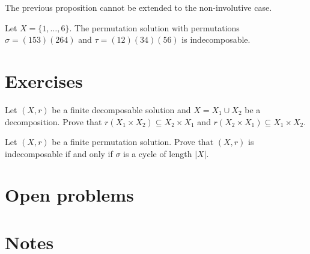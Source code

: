 The previous proposition cannot be extended to the non-involutive case. 

\begin{example}
Let $X=\{1,\dots,6\}$. The permutation solution with 
permutations $\sigma=(153)(264)$ and $\tau=(12)(34)(56)$ is indecomposable.
\end{example}

\section*{Exercises}

\begin{prob}
\label{prob:decomposition}
Let $(X,r)$ be a finite decomposable solution and $X=X_1\cup X_2$ be a decomposition. Prove that
$r(X_1\times X_2)\subseteq X_2\times X_1$ and 
$r(X_2\times X_1)\subseteq X_1\times X_2$. 
\end{prob}

\begin{prob}
Let $(X,r)$ be a finite  permutation solution. 
Prove that $(X,r)$ is indecomposable if and only if $\sigma$ is a cycle of length $|X|$.
\end{prob}


\section*{Open problems}
\section*{Notes}